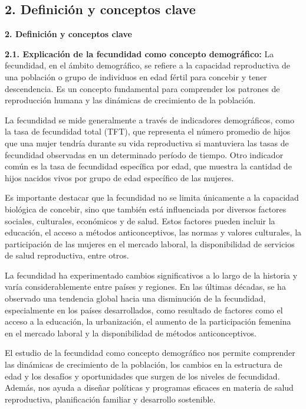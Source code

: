 \documentclass[8pt,a4paper]{beamer}
\begin{document}
{\subsection{2. Definición y conceptos clave}
\begin{frame}{\textbf{2. Definición y conceptos clave}}
\begin{block}{\textbf{2.1. Explicación de la fecundidad como concepto demográfico:}}
\setlength{\parskip}{3px}
\justifying
La fecundidad, en el ámbito demográfico, se refiere a la capacidad reproductiva de una población o grupo de individuos en edad fértil para concebir y tener descendencia. Es un concepto fundamental para comprender los patrones de reproducción humana y las dinámicas de crecimiento de la población.

La fecundidad se mide generalmente a través de indicadores demográficos, como la tasa de fecundidad total (TFT), que representa el número promedio de hijos que una mujer tendría durante su vida reproductiva si mantuviera las tasas de fecundidad observadas en un determinado período de tiempo. Otro indicador común es la tasa de fecundidad específica por edad, que muestra la cantidad de hijos nacidos vivos por grupo de edad específico de las mujeres.

Es importante destacar que la fecundidad no se limita únicamente a la capacidad biológica de concebir, sino que también está influenciada por diversos factores sociales, culturales, económicos y de salud. Estos factores pueden incluir la educación, el acceso a métodos anticonceptivos, las normas y valores culturales, la participación de las mujeres en el mercado laboral, la disponibilidad de servicios de salud reproductiva, entre otros.

\end{block}
\end{frame}

\begin{frame}{}
\begin{block}{}
\setlength{\parskip}{3px}
\justifying
La fecundidad ha experimentado cambios significativos a lo largo de la historia y varía considerablemente entre países y regiones. En las últimas décadas, se ha observado una tendencia global hacia una disminución de la fecundidad, especialmente en los países desarrollados, como resultado de factores como el acceso a la educación, la urbanización, el aumento de la participación femenina en el mercado laboral y la disponibilidad de métodos anticonceptivos.

El estudio de la fecundidad como concepto demográfico nos permite comprender las dinámicas de crecimiento de la población, los cambios en la estructura de edad y los desafíos y oportunidades que surgen de los niveles de fecundidad. Además, nos ayuda a diseñar políticas y programas eficaces en materia de salud reproductiva, planificación familiar y desarrollo sostenible.


\end{block}
\end{frame}}
\end{document}
